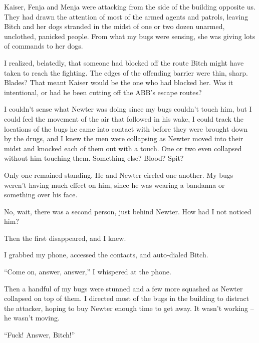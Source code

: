 Kaiser, Fenja and Menja were attacking from the side of the building opposite us.  They had drawn the attention of most of the armed agents and patrols, leaving Bitch and her dogs stranded in the midst of one or two dozen unarmed, unclothed, panicked people.  From what my bugs were sensing, she was giving lots of commands to her dogs.



I realized, belatedly, that someone had blocked off the route Bitch might have taken to reach the fighting.  The edges of the offending barrier were thin, sharp.  Blades?  That meant Kaiser would be the one who had blocked her.  Was it intentional, or had he been cutting off the ABB's escape routes?



I couldn't sense what Newter was doing since my bugs couldn't touch him, but I could feel the movement of the air that followed in his wake, I could track the locations of the bugs he came into contact with before they were brought down by the drugs, and I knew the men were collapsing as Newter moved into their midst and knocked each of them out with a touch.  One or two even collapsed without him touching them.  Something else?  Blood?  Spit?



Only one remained standing.  He and Newter circled one another.  My bugs weren't having much effect on him, since he was wearing a bandanna or something over his face.



No, wait, there was a second person, just behind Newter.  How had I not noticed him?



Then the first disappeared, and I knew.



I grabbed my phone, accessed the contacts, and auto-dialed Bitch.



``Come on, answer, answer,'' I whispered at the phone.



Then a handful of my bugs were stunned and a few more squashed as Newter collapsed on top of them.  I directed most of the bugs in the building to distract the attacker, hoping to buy Newter enough time to get away.  It wasn't working – he wasn't moving.



``Fuck! Answer, Bitch!''



